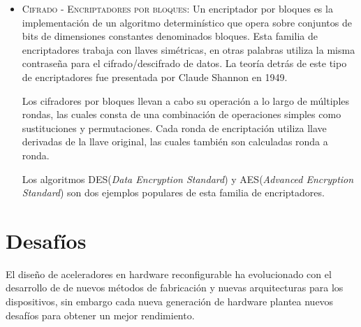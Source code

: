 \begin{itemize}
			\item 	\textsc{Cifrado - Encriptadores por bloques}: Un encriptador por bloques es la implementación de un algoritmo determinístico que opera sobre conjuntos de bits de dimensiones constantes denominados bloques. Esta familia de encriptadores trabaja con llaves simétricas, en otras palabras utiliza la misma contraseña para el cifrado/descifrado de datos. La teoría detrás de este tipo de encriptadores fue presentada por Claude Shannon\cite{chapter0:6769090} en 1949.

			Los cifradores por bloques llevan a cabo su operación a lo largo de múltiples rondas, las cuales consta de una combinación de operaciones simples como sustituciones y permutaciones. Cada ronda de encriptación utiliza llave derivadas de la llave original, las cuales también son calculadas ronda a ronda.

			Los algoritmos DES\cite{chapter0:NIST:1977:DES}(\textit{Data Encryption Standard}) y AES\cite{chapter0:Daemen:2002:DR:560131}(\textit{Advanced Encryption Standard}) son dos ejemplos populares de esta familia de encriptadores.

		\end{itemize}



\section{Desafíos}
	\label{desafios}

	El diseño de aceleradores en hardware reconfigurable ha evolucionado con el desarrollo de de nuevos métodos de fabricación y nuevas arquitecturas para los dispositivos, sin embargo cada nueva generación de hardware plantea nuevos desafíos para obtener un mejor rendimiento.

